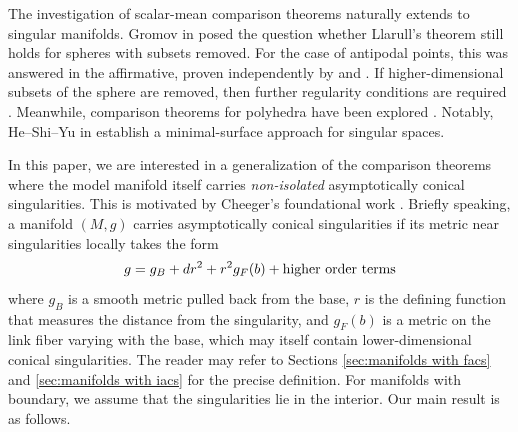 \documentclass[12pt, reqno]{amsart}
\theoremstyle{plain} %
\theoremstyle{definition}
\theoremstyle{remark}
\numberwithin{equation}{section}
\begin{document}
The investigation of scalar-mean comparison theorems naturally extends to singular manifolds.
Gromov in \cite{Gromov:2021} posed the question whether Llarull's theorem still holds for spheres with subsets removed. For the case of antipodal points, this was answered in the affirmative, proven independently by \cite{MR4733718} and \cite{WangXie25}. If higher-dimensional subsets of the sphere are removed, then further regularity conditions are required \cite{cecchini2022lipschitz,WX24linf,CLZ24,CWXZ,Xiequant}.
Meanwhile, comparison theorems for polyhedra have been explored \cite{Gromov:2021,Wang:2023,MR4689374,WXwarped}. Notably, He--Shi--Yu in \cite{HeShiYu25} establish a minimal-surface approach for singular spaces.



In this paper, we are interested in a generalization of the comparison theorems where the model manifold itself carries \emph{non-isolated} asymptotically conical singularities.
This is motivated by Cheeger's foundational work \cite{MR730920}. Briefly speaking, a manifold \((M,g)\) carries asymptotically conical singularities if its metric near singularities locally takes the form
\begin{equation*}
    g=g_B+dr^2+r^2g_F(b)+\textup{higher order terms}
\end{equation*}
where \(g_B\) is a smooth metric pulled back from the base, \(r\) is the defining function that measures the distance from the singularity, and \(g_F(b)\) is a metric on the link fiber varying with the base, which may itself contain lower-dimensional conical singularities. The reader may refer to Sections \ref{sec:manifolds with facs} and \ref{sec:manifolds with iacs} for the precise definition. For manifolds with boundary, we assume that the singularities lie in the interior. Our main result is as follows.
\end{document}
